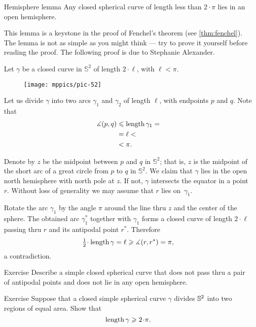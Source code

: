 \begin{thm}{Hemisphere lemma}\label{lem:hemisphere}
Any closed spherical curve of length less than $2\cdot \pi$ lies in an open hemisphere. 
\end{thm}

This lemma is a keystone in the proof of Fenchel's theorem (see \ref{thm:fenchel}).
The lemma is not as simple as you might think --- try to prove it yourself before reading the proof.
The following proof is due to Stephanie Alexander.

Let $\gamma$ be a closed curve in $\mathbb{S}^2$ of length $2\cdot\ell$, with $\ell<\pi$.


\begin{wrapfigure}[8]{o}{35mm}
\vskip-0mm
\centering
\texttt{[image: mppics/pic-52]}
\end{wrapfigure}

Let us divide $\gamma$ into two arcs $\gamma_1$ and $\gamma_2$ of length $\ell$, with endpoints $p$ and $q$. 
Note that 
\begin{align*}
\measuredangle(p,q)&\leqslant \mathop{\rm length}\nolimits \gamma_1=
\\
&= \ell<
\\
&<\pi.
\end{align*}

Denote by $z$ be the midpoint between $p$ and $q$ in $\mathbb{S}^2$;
that is, $z$ is the midpoint of the short arc of a great circle from $p$ to $q$ in $\mathbb{S}^2$. 
We claim that $\gamma$ lies in the open north hemisphere with north pole at $z$.  
If not, $\gamma$ intersects the equator in a point $r$.
Without loss of generality we may assume that $r$ lies on~$\gamma_1$. 

Rotate the arc $\gamma_1$ by the angle $\pi$ around the line thru $z$ and the center of the sphere.
The obtained arc $\gamma_1^{*}$ together with $\gamma_1$ forms a closed curve of length $2\cdot \ell$ passing thru $r$ and its antipodal point $r^{*}$.
Therefore
\[\tfrac12\cdot\length \gamma=\ell\ge \measuredangle(r,r^{*})=\pi,\] 
a contradiction.
\qeds

\begin{thm}{Exercise}\label{ex:antipodal}
Describe a simple closed spherical curve that does not pass thru a pair of antipodal points and does not lie in any open  hemisphere.
\end{thm}


\begin{thm}{Exercise}\label{ex:bisection-of-S2}
Suppose that a closed simple spherical curve $\gamma$ divides $\mathbb{S}^2$ into two regions of equal area.
Show that 
\[\length\gamma\ge2\cdot\pi.\]
\end{thm}


